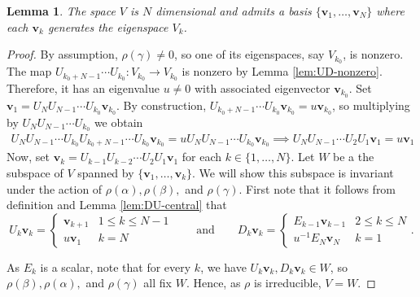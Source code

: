 \documentclass{article}
\renewcommand{\v}{\mathbf{v}}
\renewcommand{\a}{\alpha}
\renewcommand{\b}{\beta}
\newcommand{\g}{\gamma}
\newtheorem{lemma}[theorem]{Lemma}
\theoremstyle{definition}
\renewcommand{\g}{\gamma}
\renewcommand{\a}{\alpha}
\renewcommand{\b}{\beta}
\begin{document}
\begin{lemma}\label{lem:eigenspace}
The space $V$ is $N$ dimensional and admits a basis $\{\v_1,\ldots,\v_N\}$ where each $\v_k$ generates the eigenspace $V_k$.
\end{lemma}
\begin{proof}
 By assumption, $\rho(\g)\neq 0$, so one of its eigenspaces, say $V_{k_0}$, is nonzero. The map $U_{k_0+N-1}\cdots U_{k_0}:V_{k_0}\to V_{k_0}$ is nonzero by Lemma \ref{lem:UD-nonzero}. Therefore, it has an eigenvalue $u\neq 0$ with associated eigenvector $\v_{k_0}$. Set $\v_1=U_NU_{N-1}\cdots U_{k_0}\v_{k_0}$. By construction, $U_{k_0+N-1}\cdots U_{k_0}\v_{k_0}=u\v_{k_0}$, so multiplying by $U_NU_{N-1}\cdots U_{k_0}$ we obtain
    \begin{align*}
        U_NU_{N-1}\cdots U_{k_0}U_{k_0+N-1}\cdots U_{k_0}\v_{k_0}=uU_NU_{N-1}\cdots U_{k_0}\v_{k_0}
        \implies 
        U_NU_{N-1}\cdots U_2U_1\v_1=u\v_1
    \end{align*}
    Now, set $\v_k=U_{k-1}U_{k-2}\cdots U_2U_1\v_1$ for each $k\in \{1,\ldots,N\}$. Let $W$ be a the subspace of $V$ spanned by $\{\v_1,\ldots,\v_k\}$. We will show this subspace is invariant under the action of $\rho(\alpha),\rho(\beta),$ and $\rho(\g)$. First note that it follows from definition and Lemma \ref{lem:DU-central} that
    \[
    U_k\v_k=\begin{cases}
        \v_{k+1}&1\leq k\leq N-1\\
        u\v_1&k=N
    \end{cases}
    \qquad\text{and}\qquad
    D_k\v_k=\begin{cases}
        E_{k-1}\v_{k-1} & 2\leq k \leq N\\
        u^{-1}E_N\v_N & k=1
    \end{cases}.
    \]

    As $E_k$ is a scalar, note that for every $k$, we have $U_k\v_k,D_k\v_k\in W$, so $\rho(\b),\rho(\a),$ and $\rho(\gamma)$ all fix $W$. Hence, as $\rho$ is irreducible, $V=W$. 
\end{proof}
\end{document}
